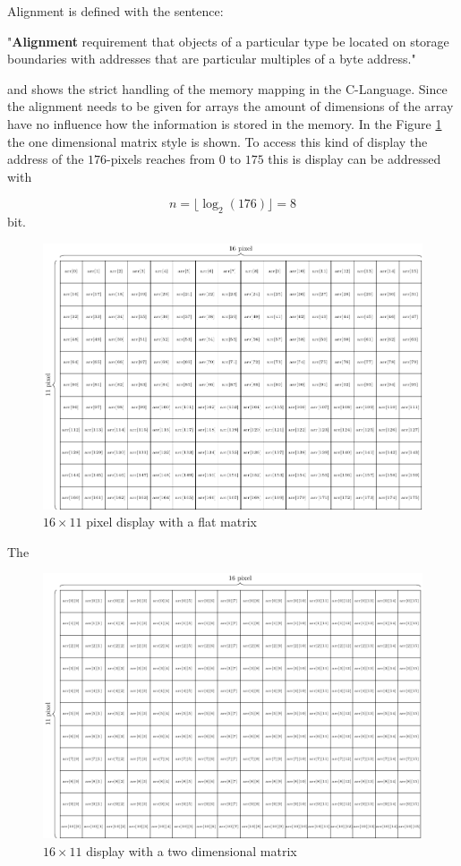 Alignment is defined with the sentence:
\begin{displayquote}
	"\textbf{Alignment} requirement that objects of a particular type be located on storage boundaries with addresses that are particular multiples of a byte address."
\end{displayquote}\cite{ISO/IEC9899}

 and shows the strict handling of the memory mapping in the C-Language. Since the alignment needs to be given for arrays the amount of dimensions of the array have no influence how the information is stored in the memory. In the Figure \ref{theory:matrix} the one dimensional matrix style is shown. To access this kind of display the address of the $176$-pixels reaches from $0$ to $175$ this is display can be addressed with 
 
 $$n = \lfloor \log_{2}(176) \rfloor = 8$$
 bit.   

\begin{figure}[H]
	\centering
	\includegraphics[width=1\textwidth]{2-theory/drawing-graphics/graphics/matrix.pdf}
	\caption{$16\times 11$ pixel display with a flat matrix \label{theory:matrix}}
\end{figure}

The 

\begin{figure}[H]
	\centering
	\includegraphics[width=1\textwidth]{2-theory/drawing-graphics/graphics/matrix2.pdf}
	\caption{$16\times 11$ display with a two dimensional matrix\label{theory:matrix2}}
\end{figure}

